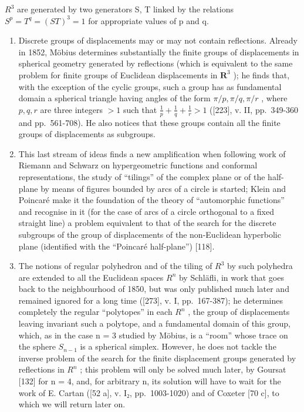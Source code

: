 \(R^{3}\) are generated by two generators S, T linked by the relations \(S^{p} = T^{q} = (ST)^{3} = 1\) for appropriate values of p and q.

\begin{enumerate}
\def\labelenumi{\arabic{enumi}.}
\setcounter{enumi}{1}
\item
  Discrete groups of displacements may or may not contain reflections. Already in 1852, Möbius determines substantially the finite groups of displacements in spherical geometry generated by reflections (which is equivalent to the same problem for finite groups of Euclidean displacements in \(\mathbf{R}^3\) ); he finds that, with the exception of the cyclic groups, such a group has as fundamental domain a spherical triangle having angles of the form \(\pi / p, \pi / q, \pi / r\) , where \(p, q, r\) are three integers \(>1\) such that \(\frac{1}{p} + \frac{1}{q} + \frac{1}{r} > 1\) ({[}223{]}, v. II, pp.~349-360 and pp.~561-708). He also notices that these groups contain all the finite groups of displacements as subgroups.
\item
  This last stream of ideas finds a new amplification when following work of Riemann and Schwarz on hypergeometric functions and conformal representations, the study of ``tilings'' of the complex plane or of the half-plane by means of figures bounded by arcs of a circle is started; Klein and Poincaré make it the foundation of the theory of ``automorphic functions'' and recognise in it (for the case of arcs of a circle orthogonal to a fixed straight line) a problem equivalent to that of the search for the discrete subgroups of the group of displacements of the non-Euclidean hyperbolic plane (identified with the ``Poincaré half-plane'') {[}118{]}.
\item
  The notions of regular polyhedron and of the tiling of \(R^{3}\) by such polyhedra are extended to all the Euclidean spaces \(R^{n}\) by Schläfli, in work that goes back to the neighbourhood of 1850, but was only published much later and remained ignored for a long time ({[}273{]}, v. I, pp.~167-387); he determines completely the regular ``polytopes'' in each \(R^{n}\) , the group of displacements leaving invariant such a polytope, and a fundamental domain of this group, which, as in the case n = 3 studied by Möbius, is a ``room'' whose trace on the sphere \(S_{n-1}\) is a spherical simplex. However, he does not tackle the inverse problem of the search for the finite displacement groups generated by reflections in \(R^{n}\) ; this problem will only be solved much later, by Goursat {[}132{]} for n = 4, and, for arbitrary n, its solution will have to wait for the work of E. Cartan ({[}52 a{]}, v. I₂, pp.~1003-1020) and of Coxeter {[}70 c{]}, to which we will return later on.
\end{enumerate}

